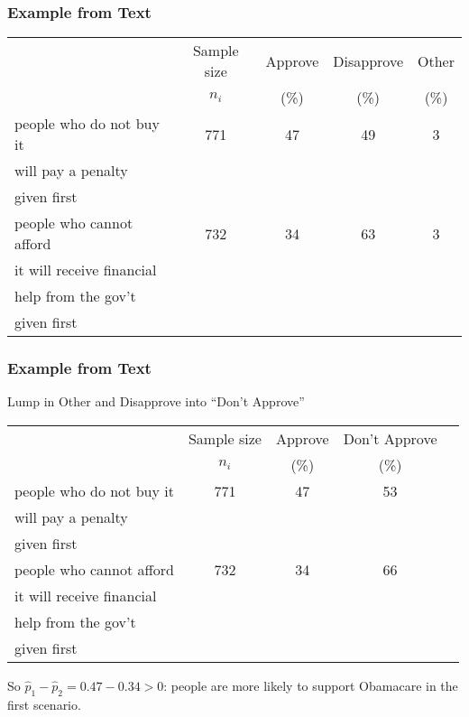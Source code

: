 \documentclass[handout]{beamer}
\newcommand{\blue}[1]{\textcolor{blue2}{#1}}
\newcommand{\phat}{\widehat{p}}
\begin{document}
\begin{frame}[fragile]
\frametitle{Example from Text}

\begin{small}
\begin{center}
  \begin{tabular}{l|cccc}
     & Sample size & Approve & Disapprove & Other \\ 
     &  $n_i$ & (\%) & (\%) &  (\%)\\   
    \hline
    \blue{people who do not buy it}   & 771 & 47 & 49 & 3 \\ 
    \blue{will pay a penalty}  & &  &  &  \\ 
    given first & &  &  &  \\     
    \hline
    \blue{people who cannot afford} & 732 & 34 & 63 & 3 \\ 
    \blue{it will receive financial}  & & & &  \\ 
    \blue{help from the gov't} & & & &  \\ 
    given first & & & &  \\    
   \end{tabular}
\end{center}
\end{small}

\end{frame}


\begin{frame}[fragile]
\frametitle{Example from Text}

Lump in Other and Disapprove into ``Don't Approve''

\begin{small}
\begin{center}
  \begin{tabular}{l|cccc}
     & Sample size & Approve & Don't Approve \\ 
     &  $n_i$ & (\%) & (\%) \\   
  \hline
    \blue{people who do not buy it}   & 771 & 47 & 53 \\ 
    \blue{will pay a penalty}\\ 
    given first\\     
    \hline
    \blue{people who cannot afford} & 732 & 34 & 66 \\ 
    \blue{it will receive financial}\\ 
    \blue{help from the gov't}\\ 
    given first\\    
   \end{tabular}
\end{center}
\end{small}
\pause So $\phat_1 - \phat_2 = 0.47 - 0.34 > 0$:  people are more likely to support Obamacare in the first scenario.
\end{frame}
\end{document}
